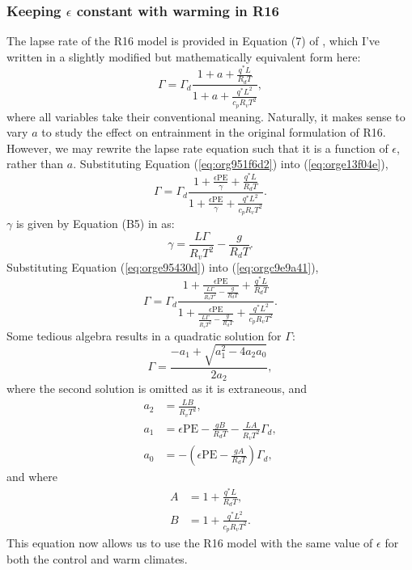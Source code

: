 \documentclass[11pt]{article}
\begin{document}
\subsubsection*{Keeping \(\epsilon\) constant with warming in R16}
\label{sec:org311f93c}
The lapse rate of the R16 model is provided in Equation (7) of \cite{romps2016}, which I've written in a slightly modified but mathematically equivalent form here:
\begin{equation}
\label{eq:orge13f04e}
\Gamma = \Gamma_d \frac{1 + a + \frac{q^* L}{R_d T} }{ 1 + a + \frac{q^* L^2}{c_p R_v T^2} },
\end{equation}
where all variables take their conventional meaning. Naturally, it makes sense to vary \(a\) to study the effect on entrainment in the original formulation of R16. However, we may rewrite the lapse rate equation such that it is a function of \(\epsilon\), rather than \(a\). Substituting Equation (\ref{eq:org951f6d2}) into (\ref{eq:orge13f04e}),
\begin{equation}
\label{eq:orgc9e9a41}
\Gamma = \Gamma_d \frac{1 + \frac{\epsilon \mathrm{PE}}{\gamma} + \frac{q^* L}{R_d T} }{ 1 + \frac{\epsilon \mathrm{PE}}{\gamma} + \frac{q^* L^2}{c_p R_v T^2} }.
\end{equation}
\(\gamma\) is given by Equation (B5) in \cite{romps2016} as:
\begin{equation}
\label{eq:orge95430d}
\gamma = \frac{L\Gamma}{R_v T^2} - \frac{g}{R_d T}.
\end{equation}
Substituting Equation (\ref{eq:orge95430d}) into (\ref{eq:orgc9e9a41}),
\begin{equation}
\label{eq:orgdee5432}
\Gamma = \Gamma_d \frac{1 + \frac{\epsilon \mathrm{PE}}{\frac{L\Gamma}{R_v T^2} - \frac{g}{R_d T}} + \frac{q^* L}{R_d T} }{ 1 + \frac{\epsilon \mathrm{PE}}{\frac{L\Gamma}{R_v T^2} - \frac{g}{R_d T}} + \frac{q^* L^2}{c_p R_v T^2} }.
\end{equation}
Some tedious algebra results in a quadratic solution for \(\Gamma\):
\begin{equation}
\Gamma = \frac{-a_1+\sqrt{a_1^2-4a_2a_0}}{2a_2},
\end{equation}
where the second solution is omitted as it is extraneous, and
\begin{align}
a_2 &= \frac{LB}{R_v T^2}, \\
a_1 &= \epsilon \mathrm{PE} - \frac{gB}{R_d T} - \frac{LA}{R_v T^2}\Gamma_d, \\
a_0 &= -\left(\epsilon \mathrm{PE} - \frac{gA}{R_d T} \right)\Gamma_d,
\end{align}
and where
\begin{align}
A &= 1 + \frac{q^* L}{R_d T}, \\
B &= 1 + \frac{q^* L^2}{c_p R_v T^2}.
\end{align}
This equation now allows us to use the R16 model with the same value of \(\epsilon\) for both the control and warm climates.
\end{document}
